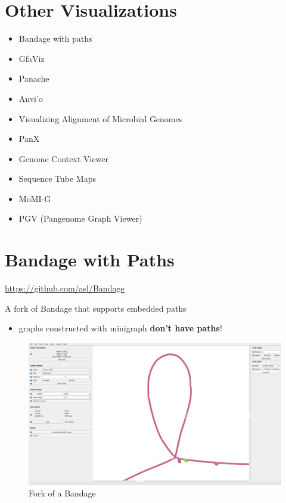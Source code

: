 \documentclass[
]{book}
\providecommand{\tightlist}{%
  \setlength{\itemsep}{0pt}\setlength{\parskip}{0pt}}
\begin{document}
\hypertarget{other-visualizations}{%
\section{Other Visualizations}\label{other-visualizations}}

\begin{itemize}
\tightlist
\item
  Bandage with paths
\item
  GfaViz
\item
  Panache
\item
  Anvi'o
\item
  Visualizing Alignment of Microbial Genomes
\item
  PanX
\item
  Genome Context Viewer
\item
  Sequence Tube Maps
\item
  MoMI-G
\item
  PGV (Pangenome Graph Viewer)
\end{itemize}

\hypertarget{bandage-with-paths}{%
\section{Bandage with Paths}\label{bandage-with-paths}}

\url{https://github.com/asl/Bandage}

A fork of Bandage that supports embedded paths

\begin{itemize}
\tightlist
\item
  graphs constructed with minigraph \textbf{don't have paths}!
\end{itemize}

\begin{figure}
\centering
\includegraphics[width=1\textwidth,height=\textheight]{./Figures/Fork.png}
\caption{Fork of a Bandage}
\end{figure}
\end{document}
